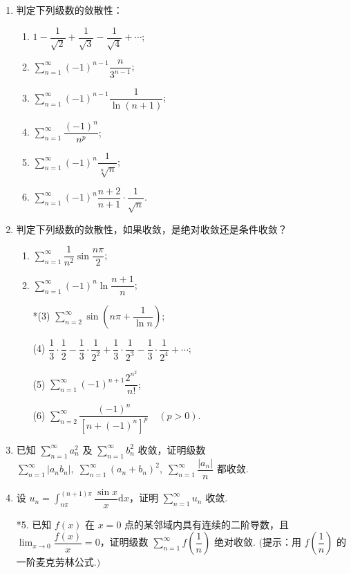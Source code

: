 \begin{enumerate}\setlength{\itemsep}{7pt}
    \item 判定下列级数的敛散性：
    \begin{enumerate}[(1)]\setlength{\itemsep}{10pt}\setlength{\topsep}{15pt}
        \item $\displaystyle 1-\dfrac{1}{\sqrt{2}}+\dfrac{1}{\sqrt{3}}-\dfrac{1}{\sqrt{4}}+\cdots$;
        \item $\displaystyle \sum_{n=1}^{\infty}(-1)^{n-1}\dfrac{n}{3^{n-1}}$;
        \item $\displaystyle \sum_{n=1}^{\infty}(-1)^{n-1}\dfrac{1}{\ln(n+1)}$;
        \item $\displaystyle \sum_{n=1}^{\infty}\dfrac{(-1)^n}{n^p}$;
        \item $\displaystyle \sum_{n=1}^{\infty}(-1)^{n}\dfrac{1}{\sqrt[n]{n}}$;
        \item $\displaystyle \sum_{n=1}^{\infty}(-1)^{n}\dfrac{n+2}{n+1}\cdot\dfrac{1}{\sqrt{n}}$.
    \end{enumerate}

    \item 判定下列级数的敛散性，如果收敛，是绝对收敛还是条件收敛？
    \begin{enumerate}\setlength{\itemsep}{10pt}\setlength{\topsep}{15pt}
        \item $\displaystyle \sum_{n=1}^{\infty}\dfrac{1}{n^2}\sin\dfrac{n\pi}{2}$;
        \item $\displaystyle \sum_{n=1}^{\infty}(-1)^n\ln\dfrac{n+1}{n}$;
        \item[*(3)] $\displaystyle \sum_{n=2}^{\infty}\sin\left(n\pi+\dfrac{1}{\ln n}\right)$;
        \item[(4)] $\displaystyle \dfrac{1}{3}\cdot\dfrac{1}{2}-\dfrac{1}{3}\cdot\dfrac{1}{2^2}+\dfrac{1}{3}\cdot\dfrac{1}{2^3}-\dfrac{1}{3}\cdot\dfrac{1}{2^4}+\cdots$;
        \item[(5)] $\displaystyle \sum_{n=1}^{\infty}(-1)^{n+1}\dfrac{2^{n^2}}{n!}$;
        \item[(6)] $\displaystyle \sum_{n=2}^{\infty}\dfrac{(-1)^{n}}{[n+(-1)^n]^p}\quad(p>0)$.  
    \end{enumerate}

    \item 已知 $\displaystyle \sum_{n=1}^{\infty}a_n^2$ 及 $\displaystyle \sum_{n=1}^{\infty}b_n^2$ 收敛，证明级数 $\displaystyle \sum_{n=1}^{\infty}|a_nb_n|,\;\sum_{n=1}^{\infty}(a_n+b_n)^2,\;\sum_{n=1}^{\infty}\dfrac{|a_n|}{n}$ 都收敛.
    
    \item 设 $\displaystyle u_n=\int_{n\pi}^{(n+1)\pi}\dfrac{\sin x}{x}\text{d}x$，证明 $\sum_{n=1}^{\infty}u_n$ 收敛.
    
    \item[*5.] 已知 $f(x)$ 在 $x=0$ 点的某邻域内具有连续的二阶导数，且 $\displaystyle\lim_{x\to0}\dfrac{f(x)}{x}=0$，证明级数 $\displaystyle \sum_{n=1}^{\infty}f\left(\dfrac{1}{n}\right)$ 绝对收敛.  $\bigg($提示：用 $f\left(\dfrac{1}{n}\right)$ 的一阶麦克劳林公式.$\bigg)$
\end{enumerate}

